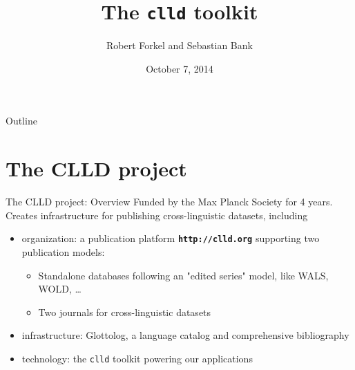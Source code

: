 \documentclass{beamer}
\title[The \texttt{clld} toolkit]{The \texttt{clld} toolkit}
\author{Robert Forkel and Sebastian Bank}
\institute{Max Planck Institute for Evolutionary Anthropology, Leipzig}
\date{October 7, 2014}
\begin{document}
\begin{frame}
  \titlepage
\end{frame}

\begin{frame}{Outline}

  \tableofcontents
\end{frame}

\section{The CLLD project}

\begin{frame}{The CLLD project: Overview}
Funded by the Max Planck Society for 4 years.
\vskip 0.5cm
Creates infrastructure for publishing cross-linguistic datasets, including
\begin{itemize}
\item organization: a publication platform \texttt{\textbf{http://clld.org}} supporting two publication models:
\begin{itemize}
\item Standalone databases following an "edited series" model, like WALS, WOLD, \dots
\item Two journals for cross-linguistic datasets
\end{itemize}
\item infrastructure: Glottolog, a language catalog and comprehensive bibliography
\item technology: the \texttt{clld} toolkit powering our applications
\end{itemize}
\end{frame}
\end{document}
